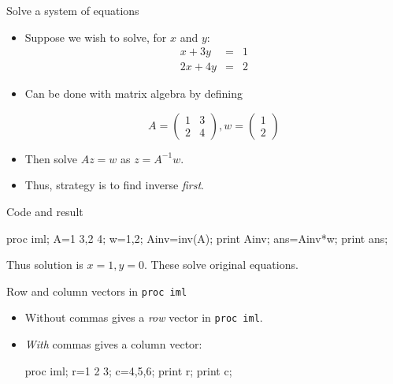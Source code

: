 \documentclass[unknownkeysallowed]{beamer}\usepackage[]{graphicx}\usepackage[]{color}
\begin{document}
\begin{frame}[fragile]{Solve a system of equations}

  \begin{itemize}
  \item Suppose we wish to solve, for $x$ and $y$:
\begin{eqnarray*}
  x+3y & =& 1\\
  2x+4y &=& 2
\end{eqnarray*}
\item Can be done with matrix algebra by defining
  
  $$ A = \left( 
    \begin{array}{cc}
      1 & 3 \\ 2 & 4
    \end{array}
    \right), 
    w = \left( 
      \begin{array}{c}
        1 \\ 2
      \end{array}
      \right)
      $$
    \item Then solve $Az=w$ as $z=A^{-1}w$.
    \item Thus, strategy is to find inverse \emph{first}.

  \end{itemize}
  



    
    
  
\end{frame}

\begin{frame}[fragile]{Code and result}
  
    \begin{Sascode}[store=img]
proc iml;
  A={1 3,2 4};
  w={1,2};
  Ainv=inv(A);
  print Ainv;
  ans=Ainv*w;
  print ans;
    \end{Sascode}
    
    
  Thus solution is $x=1, y=0$. These solve original equations.
  
\end{frame}

\begin{frame}[fragile]{Row and column vectors in \texttt{proc iml}}
  
  \begin{itemize}
  \item Without commas gives a \emph{row} vector in \texttt{proc iml}.
  \item \emph{With} commas gives a column vector:
    
    \begin{Sascode}[store=imh]
proc iml;
  r={1 2 3};
  c={4,5,6};
  print r;
  print c;
    \end{Sascode}
    
  \end{itemize}
  
\end{frame}
\end{document}
